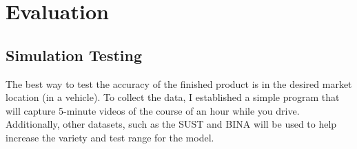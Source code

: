 \chapter*{Evaluation}
\label{sec:evaluation}

\section{Simulation Testing}
The best way to test the accuracy of the finished product is in the desired market location (in a vehicle). To collect the data, I
established a simple program that will capture 5-minute videos of the course of an hour while you drive. Additionally, other datasets,
such as the SUST \cite{SUST} and BINA \cite{BINA}will be used to help increase the variety and test range for the model.

